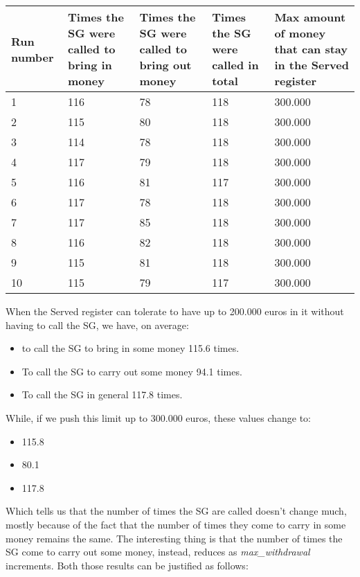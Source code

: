\documentclass{article}
\begin{document}
\begin{center}
\begin{tabular}{ | m{2cm} | m{2.5cm}| m{2.5cm} | m{2.5cm} | m{3cm} |}
 \hline
 Run number & Times the SG were called to bring in money & Times the SG were called to bring out money & Times the SG were called in total & Max amount of money that can stay in the Served register\\
 \hline
 1 & 116 & 78 & 118 & 300.000\\
 \hline
 2 & 115 & 80 & 118 & 300.000\\
 \hline
 3 & 114 & 78 & 118 & 300.000\\
 \hline
 4 & 117 & 79 & 118 & 300.000\\
 \hline
 5 & 116 & 81 & 117 & 300.000\\
 \hline
 6 & 117 & 78 & 118 & 300.000\\
 \hline
 7 & 117 & 85 & 118 & 300.000\\
 \hline
 8 & 116 & 82 & 118 & 300.000\\
 \hline
 9 & 115 & 81 & 118 & 300.000\\
 \hline
 10 & 115 & 79 & 117 & 300.000\\
 \hline
\end{tabular}
\end{center}
When the Served register can tolerate to have up to 200.000 euros in it without having to call the SG, we have, on average:
\begin{itemize}
    \item to call the SG to bring in some money 115.6 times.
    \item To call the SG to carry out some money 94.1 times.
    \item To call the SG in general 117.8 times.
\end{itemize}
While, if we push this limit up to 300.000 euros, these values change to:
\begin{itemize}
    \item 115.8
    \item 80.1
    \item 117.8
\end{itemize}
Which tells us that the number of times the SG are called doesn't change much, mostly because of the fact that the number of times they come to carry in some money remains the same. The interesting thing is that the number of times the SG come to carry out some money, instead, reduces as \emph{max\_withdrawal} increments. Both those results can be justified as follows:
\end{document}
